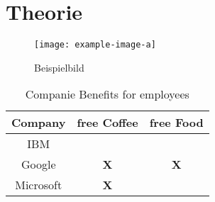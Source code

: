 \chapter{Theorie}

\blindtext  
\begin{figure}[htb]
    \centering
   \texttt{[image: example-image-a]}
    \caption[Beispielbild]{Beispielbild \label{example}}
\end{figure}
\blindtext   

\begin{table}[htb]
\centering
 \begin{tabular}{|c || c c|} 
 \hline
Company & free Coffee & free Food \\
 \hline
 IBM & \textbf{} & \textbf{} \\ 
 Google & \textbf{X} & \textbf{X}\\
 Microsoft &\textbf{X}  & \textbf{ }\\
 \hline
\end{tabular}
\caption[Companie Benefits for employees]{\label{tab:NLP_germany}Companie Benefits for employees }
\end{table}
\blinddocument